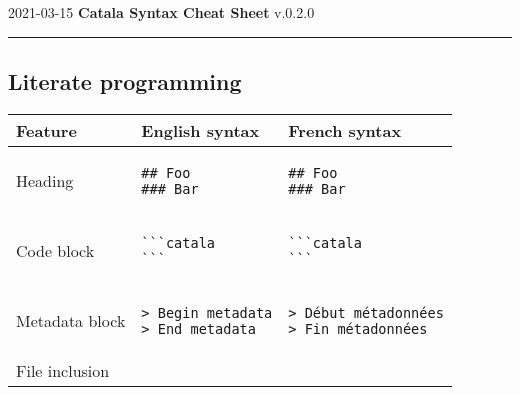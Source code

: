 \documentclass[a3paper,landscape]{article}
\begin{document}
\begin{center}
2021-03-15
\hfill
{\Huge\bfseries\sffamily
Catala Syntax Cheat Sheet}
\hfill
v.0.2.0
\end{center}
\hrule

\begin{multicols*}{2}





\section*{Literate programming}
\begin{center}
\begin{tabular}{p{}p{}p{}}
\toprule
Feature&English syntax&French syntax\\\midrule
Heading&
\vspace*{-1.75em}
\begin{verbatim}
## Foo
### Bar
\end{verbatim}
\vspace*{-1.75em}
&
\vspace*{-1.75em}
\begin{verbatim}
## Foo
### Bar
\end{verbatim}
\vspace*{-1.75em}
\\
Code block&
\vspace*{-1.75em}
\begin{verbatim}
```catala
```
\end{verbatim}
\vspace*{-1.75em}
&
\vspace*{-1.75em}
\begin{verbatim}
```catala
```
\end{verbatim}
\vspace*{-1.75em}
\\
Metadata block&
\vspace*{-1.75em}
\begin{verbatim}
> Begin metadata
> End metadata
\end{verbatim}
\vspace*{-1.75em}
&
\vspace*{-1.75em}
\begin{verbatim}
> Début métadonnées
> Fin métadonnées
\end{verbatim}
\vspace*{-1.75em}
\\
File inclusion&

\end{tabular}
\end{center}
\end{multicols*}
\end{document}
